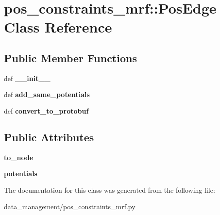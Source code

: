 \hypertarget{classpos__constraints__mrf_1_1PosEdge}{
\section{pos\_\-constraints\_\-mrf::PosEdge Class Reference}
\label{classpos__constraints__mrf_1_1PosEdge}
}
\subsection*{Public Member Functions}
\begin{DoxyCompactItemize}
\item 
\hypertarget{classpos__constraints__mrf_1_1PosEdge_a272007cd91631d6da5d300681b5724a8}{
def {\bfseries \_\-\_\-init\_\-\_\-}}
\label{classpos__constraints__mrf_1_1PosEdge_a272007cd91631d6da5d300681b5724a8}

\item 
\hypertarget{classpos__constraints__mrf_1_1PosEdge_a4eb2b4fdf04240b539f02cf3443d11ed}{
def {\bfseries add\_\-same\_\-potentials}}
\label{classpos__constraints__mrf_1_1PosEdge_a4eb2b4fdf04240b539f02cf3443d11ed}

\item 
\hypertarget{classpos__constraints__mrf_1_1PosEdge_ac55da0e7a45b1f9b910740077a08a108}{
def {\bfseries convert\_\-to\_\-protobuf}}
\label{classpos__constraints__mrf_1_1PosEdge_ac55da0e7a45b1f9b910740077a08a108}

\end{DoxyCompactItemize}
\subsection*{Public Attributes}
\begin{DoxyCompactItemize}
\item 
\hypertarget{classpos__constraints__mrf_1_1PosEdge_aeca030c4d6a5adb4ca1d8a7078209754}{
{\bfseries to\_\-node}}
\label{classpos__constraints__mrf_1_1PosEdge_aeca030c4d6a5adb4ca1d8a7078209754}

\item 
\hypertarget{classpos__constraints__mrf_1_1PosEdge_aa81ae5ac8eb21adcabc6468a9398f4db}{
{\bfseries potentials}}
\label{classpos__constraints__mrf_1_1PosEdge_aa81ae5ac8eb21adcabc6468a9398f4db}

\end{DoxyCompactItemize}


The documentation for this class was generated from the following file:\begin{DoxyCompactItemize}
\item 
data\_\-management/pos\_\-constraints\_\-mrf.py\end{DoxyCompactItemize}
